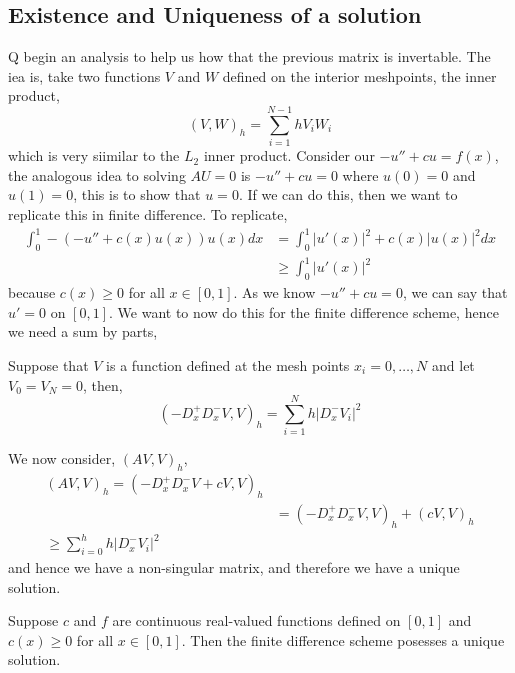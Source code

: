 \subsection{Existence and Uniqueness of a solution}
Q begin an analysis to help us how that the previous matrix is invertable. The iea is, take two functions $V$ and $W$ defined on the interior meshpoints, the inner product,
$$ (V, W)_h = \sum_{i=1}^{N-1} hV_iW_i $$
which is very siimilar to the $L_2$ inner product. Consider our $-u'' + cu = f(x)$, the analogous idea to solving $AU = 0$ is $-u'' + cu = 0$ where $u(0) = 0$ and $u(1) = 0$, this is to show that $u = 0$. If we can do this, then we want to replicate this in finite difference. To replicate,
\begin{align*}
  \int_0^1 -(- u'' + c(x)u(x))u(x) dx &= \int_0^1 |u'(x)|^2 + c(x)|u(x)|^2 dx \\
  &\ge \int_0^1 |u'(x)|^2
\end{align*}
because $c(x) \ge 0$ for all $x \in [0, 1]$. As we know $-u'' + cu = 0$, we can say that $u' = 0$ on $[0, 1]$. We want to now do this for the finite difference scheme, hence we need a sum by parts,
\begin{nlemma}
  Suppose that $V$ is a function defined at the mesh points $x_i = 0, \dots, N$ and let $V_0 = V_N = 0$, then,
  $$ (-D_x^+ D_x^-V, V)_h = \sum_{i=1}^N h \left| D_x^- V_i \right|^2 $$
\end{nlemma}

\noindent
We now consider, $(AV, V)_h$,
\begin{align*}
  (AV, V)_h = (-D_x^+ D_x^-V + cV, V)_h \\
  &= (-D_x^+D_x^-V, V)_h + (cV, V)_h \\
  \ge \sum_{i=0}^h h\left| D_x^- V_i \right|^2
\end{align*}
and hence we have a non-singular matrix, and therefore we have a unique solution.
\begin{nthm}
  Suppose $c$ and $f$ are continuous real-valued functions defined on $[0, 1]$ and $c(x) \ge 0$ for all $x \in [0, 1]$. Then the finite difference scheme posesses a unique solution.
\end{nthm}

